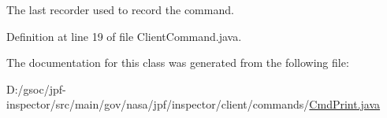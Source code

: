 The last recorder used to record the command. 



Definition at line 19 of file Client\+Command.\+java.



The documentation for this class was generated from the following file\+:\begin{DoxyCompactItemize}
\item 
D\+:/gsoc/jpf-\/inspector/src/main/gov/nasa/jpf/inspector/client/commands/\hyperlink{_cmd_print_8java}{Cmd\+Print.\+java}\end{DoxyCompactItemize}
